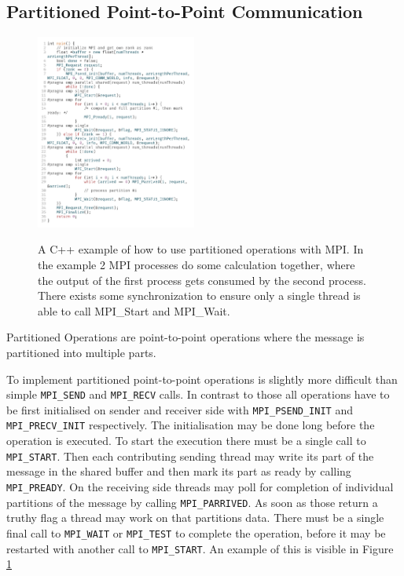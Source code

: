 \documentclass[sigconf]{acmart}
\begin{document}
\subsection{Partitioned Point-to-Point Communication}

\begin{figure}
    \caption{
        A C++ example of how to use partitioned operations with MPI.
        In the example 2 MPI processes do some calculation together, where the output of the first process gets consumed by the second process.
        There exists some synchronization to ensure only a single thread is able to call MPI\_Start and MPI\_Wait.
    }
    \includegraphics[width=0.47\textwidth]{PartitionOperations_CPP.png}
    \label{fig:PartitionedOps_CPP}
\end{figure}

Partitioned Operations are point-to-point operations where the message is partitioned into multiple parts.

To implement partitioned point-to-point operations is slightly more difficult than simple \verb|MPI_SEND| and \verb|MPI_RECV| calls.
In contrast to those all operations have to be first initialised on sender and receiver side with \verb|MPI_PSEND_INIT| and \verb|MPI_PRECV_INIT| respectively.
The initialisation may be done long before the operation is executed.
To start the execution there must be a single call to \verb|MPI_START|.
Then each contributing sending thread may write its part of the message in the shared buffer and then mark its part as ready by calling \verb|MPI_PREADY|.
On the receiving side threads may poll for completion of individual partitions of the message by calling \verb|MPI_PARRIVED|.
As soon as those return a truthy flag a thread may work on that partitions data.
There must be a single final call to \verb|MPI_WAIT| or \verb|MPI_TEST| to complete the operation, before it may be restarted with another call to \verb|MPI_START|.
An example of this is visible in Figure \ref{fig:PartitionedOps_CPP}
\end{document}
